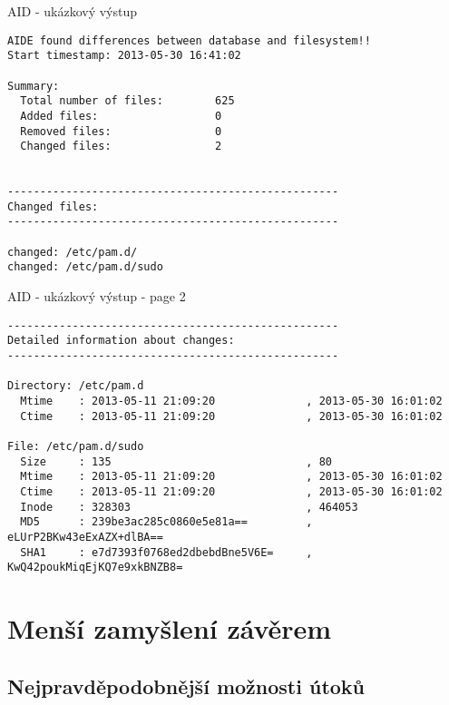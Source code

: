 \documentclass{beamer}
\begin{document}
\begin{frame}[fragile]{AID - ukázkový výstup}
	\begin{tiny}
	\begin{verbatim}
AIDE found differences between database and filesystem!!
Start timestamp: 2013-05-30 16:41:02

Summary:
  Total number of files:        625
  Added files:                  0
  Removed files:                0
  Changed files:                2


---------------------------------------------------
Changed files:
---------------------------------------------------

changed: /etc/pam.d/
changed: /etc/pam.d/sudo
	\end{verbatim}
	\end{tiny}
\end{frame}


\begin{frame}[fragile]{AID - ukázkový výstup - page 2}
	\begin{tiny}
	\begin{verbatim}
---------------------------------------------------
Detailed information about changes:
---------------------------------------------------

Directory: /etc/pam.d
  Mtime    : 2013-05-11 21:09:20              , 2013-05-30 16:01:02
  Ctime    : 2013-05-11 21:09:20              , 2013-05-30 16:01:02

File: /etc/pam.d/sudo
  Size     : 135                              , 80
  Mtime    : 2013-05-11 21:09:20              , 2013-05-30 16:01:02
  Ctime    : 2013-05-11 21:09:20              , 2013-05-30 16:01:02
  Inode    : 328303                           , 464053
  MD5      : 239be3ac285c0860e5e81a==         , eLUrP2BKw43eExAZX+dlBA==
  SHA1     : e7d7393f0768ed2dbebdBne5V6E=     , KwQ42poukMiqEjKQ7e9xkBNZB8=
	\end{verbatim}
	\end{tiny}
\end{frame}

\section{Menší zamyšlení závěrem}

\subsection{Nejpravděpodobnější možnosti útoků}
\end{document}
